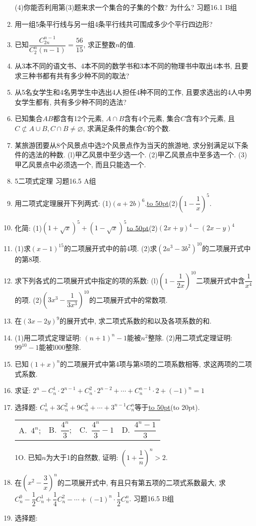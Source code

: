 \documentclass[10pt,a4paper]{article}
\newcommand{\blank}[1]{\underline{\hbox to #1pt{}}}
\newcommand{\bracket}[1]{(\hbox to #1pt{})}
\newcommand{\fourch}[4]{\par\begin{tabular}{p{.23\textwidth}p{.23\textwidth}p{.23\textwidth}p{.23\textwidth}}
A.~#1 &B.~#2& C.~#3& D.~#4
\end{tabular}}
\begin{document}
\begin{enumerate}[1.]
(4)你能否利用第(3)题来求一个集合的子集的个数? 为什么?
习题16.1   B组
\item 用一组5条平行线与另一组4条平行线共可围成多少个平行四边形?
\item 已知$\dfrac{C_{2n}^{n-1}}{C_2^n(n-1)}=\dfrac{56}{15}$, 求正整数$n$的值.
\item 从3本不同的语文书、4本不同的数学书和3本不同的物理书中取出4本书, 且要求三种书都有共有多少种不同的取法?
\item 从5名女学生和4名男学生中选出4人担任4种不同的工作, 且要求选出的4人中男女学生都有, 共有多少种不同的选法?
\item 已知集合$AB$都含有12个元素, $A\cap B$含有4个元素, 集合$C$含有3个元素, 且$C\not \subset A\cup B,C\cap B\ne \varnothing$, 求满足条件的集合$C$的个数.
\item 某旅游团要从8个风景点中选2个风景点作为当天的旅游地, 求分别满足以下条件的选法的种数.
(l)甲乙风景中至少选一个.
(2)甲乙风景点中至多选一个.
(3)甲乙风景点中必须选一个, 而且只能选一个.
\item 5二项式定理
习题16.5  A组
\item 用二项式定理展开下列两式:
(1)$(a+2b)^6$.\blank{50}(2)$(1-\dfrac 1x)^5$.
\item 化简:
(1)$(1+\sqrt x)^5+(1-\sqrt x)^5$\blank{50}(2)$(2x+y)^4-(2x-y)^4$
\item (1)求$(x-1)^{15}$的二项展开式中的前4项.
(2)求$(2a^3-3b^2)^{10}$的二项展开式中的第8项.
\item 求下列各式的二项展开式中指定的项的系数:
(l)$(1-\dfrac 1{2x})^{10}$二项展开式中含$\dfrac 1{x^4}$的项.
(2)$(3x^3-\dfrac 1{3x^3})^{10}$的二项展开式中的常数项.
\item 在$(3x-2y)^9$的展开式中, 求二项式系数的和以及各项系数的和.
\item (1)用二项式定理证明: $(n+1)^n-1$能被$n^2$整除.
(2)用二项式定理证明: $99^{10}-1$能被l000整除.
\item 已知$(1+x)^n$的二项展开式中第4项与第8项的二项系数相等, 求这两项的二项式系数.
\item 求证: $2^n-C_n^1\cdot 2^{n-1}+C_n^2\cdot 2^{n-2}+\cdots +C_n^{n-1}\cdot 2+(-1)^n=1$
\item 选择题:
$C_n^1+3C_n^2+9C_n^3+\cdots +3^{n-1}C_n^n$等于\blank{50}\bracket{20}.
\fourch{$4^n$;}{$\dfrac{4^n}3$;}{$\dfrac{4^n}3-1$}{$\dfrac{4^n-1}3$}
1O. 已知$n$为大于1的自然数, 证明: $(1+\dfrac 1n)^n>2$.
\item 在$(x^2-\dfrac 3x)^n$的二项展开式中, 有且只有第五项的二项式系数最大, 求$C_n^0-\dfrac 12C_n^1+\dfrac 14C_n^2-\cdots +(-1)^n\cdot \dfrac 12C_n^n$.
习题16.5   B组
\item 选择题:

\end{enumerate}
\end{document}
